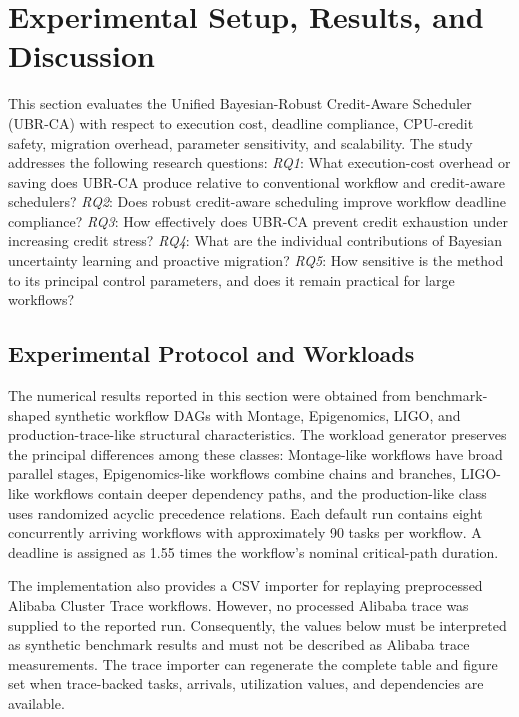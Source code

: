 
\section{Experimental Setup, Results, and Discussion}
\label{sec:experiments}

This section evaluates the Unified Bayesian-Robust Credit-Aware
Scheduler (UBR-CA) with respect to execution cost, deadline compliance,
CPU-credit safety, migration overhead, parameter sensitivity, and
scalability. The study addresses the following research questions:
\emph{RQ1}: What execution-cost overhead or saving does UBR-CA produce
relative to conventional workflow and credit-aware schedulers?
\emph{RQ2}: Does robust credit-aware scheduling improve workflow
deadline compliance?
\emph{RQ3}: How effectively does UBR-CA prevent credit exhaustion under
increasing credit stress?
\emph{RQ4}: What are the individual contributions of Bayesian
uncertainty learning and proactive migration?
\emph{RQ5}: How sensitive is the method to its principal control
parameters, and does it remain practical for large workflows?

\subsection{Experimental Protocol and Workloads}
\label{subsec:protocol}

The numerical results reported in this section were obtained from
benchmark-shaped synthetic workflow DAGs with Montage, Epigenomics,
LIGO, and production-trace-like structural characteristics. The
workload generator preserves the principal differences among these
classes: Montage-like workflows have broad parallel stages,
Epigenomics-like workflows combine chains and branches, LIGO-like
workflows contain deeper dependency paths, and the production-like
class uses randomized acyclic precedence relations. Each default run
contains eight concurrently arriving workflows with approximately 90
tasks per workflow. A deadline is assigned as 1.55 times the
workflow's nominal critical-path duration.

The implementation also provides a CSV importer for replaying
preprocessed Alibaba Cluster Trace workflows. However, no processed
Alibaba trace was supplied to the reported run. Consequently, the
values below must be interpreted as synthetic benchmark results and
must not be described as Alibaba trace measurements. The trace importer
can regenerate the complete table and figure set when trace-backed
tasks, arrivals, utilization values, and dependencies are available.

